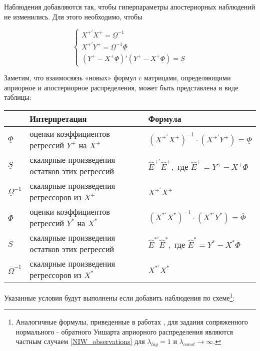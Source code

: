 \documentclass[11pt]{article} %
\newcommand{\prior}{\underline}
\newcommand{\post}{\overline}
\begin{document}
Наблюдения добавляются так, чтобы гиперпараметры апостериорных наблюдений не изменились. Для этого необходимо, чтобы

\begin{equation}
\begin{cases}
X^{+\prime}X^+=\prior \Omega^{-1} \\
X^{+\prime}Y^+=\prior \Omega^{-1}\prior \Phi \\
(Y^+-X^+\prior \Phi)'(Y^+-X^+ \prior \Phi) = \prior S
\end{cases}
\end{equation}

Заметим, что взаимосвязь «новых» формул  c матрицами, определяющими априорное и апостериорное распределения, может быть представлена в виде таблицы:

\begin{center}
\begin{table}[h!]
\begin{tabular}{lll}
\toprule
& Интерпретация& Формула\\
\midrule
 $\prior \Phi$ & оценки коэффициентов регрессий $Y^+$ на $X^+$&
 $(X^{+\prime}X^+)^{-1}\cdot (X^{+\prime}Y^+)= \prior \Phi$ \\
$\prior S$ &скалярные произведения остатков этих регрессий&
$\hat E^{+\prime} \hat E^+, \text{ где } \hat E^+=Y^+-X^+\prior \Phi
$\\
$\prior \Omega^{-1}$ & скалярные произведения регрессоров из $X^+$&
$X^{+\prime}X^+$\\
\midrule
$\post \Phi$ & оценки коэффициентов регрессий  $Y^*$ на $X^*$&
$(X^{*\prime}X^*)^{-1}\cdot (X^{*\prime}Y^*)= \post \Phi$\\
$\post S$ & скалярные произведения остатков этих регрессий&
$\hat E^{*\prime} \hat E^*, \text{ где } \hat E^*=Y^*-X^*\post\Phi$\\
$\post \Omega^{-1}$ &скалярные произведения регрессоров из $X^*$&
$X^{*\prime}X^*$\\
\bottomrule

\end{tabular}
\end{table}
\end{center}


Указанные условия будут выполнены если добавить наблюдения по схеме\footnote{Аналогичные формулы, приведенные в работах \cite{banbura_al_2010}, \cite{berg_henzel_2013} для задания сопряженного нормального - обратного Уишарта априорного распределения являются частным случаем \eqref{NIW_observations} для $\lambda_{lag}=1$ и $\lambda_{const}\to\infty$.}:
\end{document}
